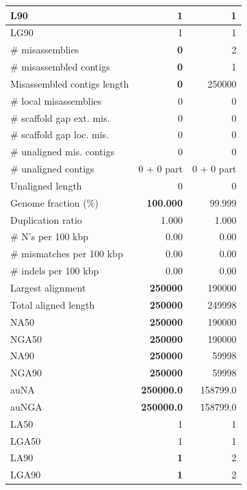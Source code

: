 \documentclass[12pt,a4paper]{article}
\begin{document}
\begin{table}[ht]
\begin{center}
\begin{tabular}{|l*{2}{|r}|}
L90 & 1 & 1 \\ \hline
LG90 & 1 & 1 \\ \hline
\# misassemblies & {\bf 0} & 2 \\ \hline
\# misassembled contigs & {\bf 0} & 1 \\ \hline
Misassembled contigs length & {\bf 0} & 250000 \\ \hline
\# local misassemblies & 0 & 0 \\ \hline
\# scaffold gap ext. mis. & 0 & 0 \\ \hline
\# scaffold gap loc. mis. & 0 & 0 \\ \hline
\# unaligned mis. contigs & 0 & 0 \\ \hline
\# unaligned contigs & 0 + 0 part & 0 + 0 part \\ \hline
Unaligned length & 0 & 0 \\ \hline
Genome fraction (\%) & {\bf 100.000} & 99.999 \\ \hline
Duplication ratio & 1.000 & 1.000 \\ \hline
\# N's per 100 kbp & 0.00 & 0.00 \\ \hline
\# mismatches per 100 kbp & 0.00 & 0.00 \\ \hline
\# indels per 100 kbp & 0.00 & 0.00 \\ \hline
Largest alignment & {\bf 250000} & 190000 \\ \hline
Total aligned length & {\bf 250000} & 249998 \\ \hline
NA50 & {\bf 250000} & 190000 \\ \hline
NGA50 & {\bf 250000} & 190000 \\ \hline
NA90 & {\bf 250000} & 59998 \\ \hline
NGA90 & {\bf 250000} & 59998 \\ \hline
auNA & {\bf 250000.0} & 158799.0 \\ \hline
auNGA & {\bf 250000.0} & 158799.0 \\ \hline
LA50 & 1 & 1 \\ \hline
LGA50 & 1 & 1 \\ \hline
LA90 & {\bf 1} & 2 \\ \hline
LGA90 & {\bf 1} & 2 \\ \hline
\end{tabular}
\end{center}
\end{table}
\end{document}
